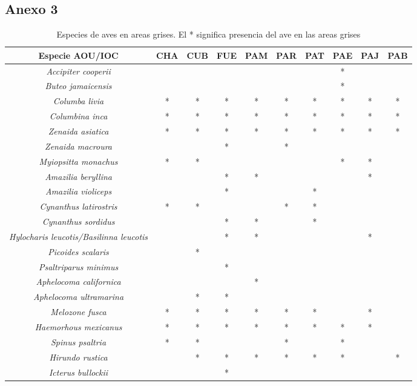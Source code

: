 \documentclass[letterpaper,12pt]{article}
\begin{document}
\subsection{Anexo 3}
{\scriptsize
\begin{longtable}[c] {|c|c|c|c|c|c|c|c|c|c|} 
\caption[Especies de aves en areas grises]{Especies de aves en areas grises. El * significa presencia del ave en las areas grises} \\ \toprule
Especie AOU/IOC & CHA & CUB & FUE & PAM & PAR & PAT & PAE & PAJ & PAB \\ \midrule
\textit{Accipiter cooperii} &  &  &  & & & & * & & \\
\textit{Buteo jamaicensis} &  &  &  & & & & * & &\\ 
\textit{Columba livia} & * & * & * & * & * & * & * & * &*\\
\textit{Columbina inca} & * & * & * & * & * & * & * & * & *  \\
\textit{Zenaida asiatica}& * & * & * & * & * & * & * & * &* \\
\textit{Zenaida macroura} &  &  & * & & * & & & & \\ 
\textit{Myiopsitta monachus} & * & * &  & & & &* & * & \\ 
\textit{Amazilia beryllina} &  &  & * & *  & & & &* &\\ 
\textit{Amazilia violiceps} &  & & * & & & *& & & \\
\textit{Cynanthus latirostris} & * & * &  & & * & * & & & \\
\textit{Cynanthus sordidus} &  &  & * & * & &* & & & \\
\textit{Hylocharis leucotis/Basilinna leucotis} &  &   & * & * & & & &* & \\
\textit{Picoides scalaris} &  & * &  & & & & & &  \\
\textit{Psaltriparus minimus} &  &  & * & & & & & & \\
\textit{Aphelocoma californica} &  &  &  & * & & & & & \\
\textit{Aphelocoma ultramarina} &  & * & * & & & & & & \\
\textit{Melozone fusca}& * & * & * & * & * & * & &* &  \\
\textit{Haemorhous mexicanus} & * & * & * & * & * & * & * & * \\
\textit{Spinus psaltria} & * & * &  &  & * & & * & &\\
\textit{Hirundo rustica} &  & * & * & * & * & * & * & & *\\
\textit{Icterus bullockii} &  &  & * & & & & & & \\

\end{longtable}}
\end{document}
